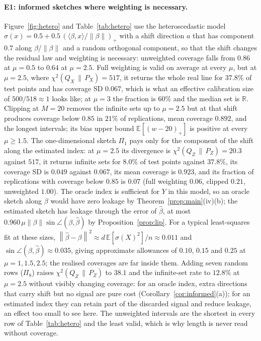 \documentclass[11pt,a4paper]{article}
\newcommand{\PX}{P_X}
\newcommand{\QX}{Q_X}
\newcommand{\chisq}{\chi^2(\QX\,\|\,\PX)}
\newcommand{\chisqZ}{\chi^2(Q_Z\,\|\,P_Z)}
\newcommand{\norm}[1]{\left\|#1\right\|}
\newcommand{\E}{\mathbb{E}}
\newcommand{\R}{\mathbb{R}}
\theoremstyle{plain}
\theoremstyle{definition}
\theoremstyle{remark}
\begin{document}
\paragraph{E1: informed sketches where weighting is necessary.}
Figure~\ref{fig:hetero} and Table~\ref{tab:hetero} use the heteroscedastic model $\sigma(x)=0.5+0.5\,(\langle\beta,x\rangle/\norm\beta)_+$ with a shift direction $a$ that has component $0.7$ along $\beta/\norm\beta$ and a random orthogonal component, so that the shift changes the residual law and weighting is necessary: unweighted coverage falls from $0.86$ at $\mu=0.5$ to $0.64$ at $\mu=2.5$. Full weighting is valid on average at every $\mu$, but at $\mu=2.5$, where $\chisq=517$, it returns the whole real line for $37.8\%$ of test points and has coverage SD $0.067$, which is what an effective calibration size of $500/518\approx1$ looks like; at $\mu=3$ the fraction is $60\%$ and the median set is $\R$. Clipping at $M=20$ removes the infinite sets up to $\mu=2.5$ but at that shift produces coverage below $0.85$ in $21\%$ of replications, mean coverage $0.892$, and the longest intervals; its bias upper bound $\E[(w-20)_+]$ is positive at every $\mu\ge1.5$. The one-dimensional sketch $\Pi_1$ pays only for the component of the shift along the estimated index: at $\mu=2.5$ its divergence is $\chisqZ=20.3$ against $517$, it returns infinite sets for $8.0\%$ of test points against $37.8\%$, its coverage SD is $0.049$ against $0.067$, its mean coverage is $0.923$, and its fraction of replications with coverage below $0.85$ is $0.07$ (full weighting $0.06$, clipped $0.21$, unweighted $1.00$). The oracle index is sufficient for $Y$ in this model, so an oracle sketch along $\beta$ would have zero leakage by Theorem~\ref{prop:main}(iv)(b); the estimated sketch has leakage through the error of $\hat\beta$, at most $0.960\,\mu\norm\beta\sin\angle(\beta,\hat\beta)$ by Proposition~\ref{prop:lip}. For a typical least-squares fit at these sizes, $\norm{\hat\beta-\beta}^2\approx d\,\E[\sigma(X)^2]/n\approx0.011$ and $\sin\angle(\beta,\hat\beta)\approx0.035$, giving approximate allowances of $0.10$, $0.15$ and $0.25$ at $\mu=1,1.5,2.5$; the realised coverages are far inside them. Adding seven random rows ($\Pi_8$) raises $\chisqZ$ to $38.1$ and the infinite-set rate to $12.8\%$ at $\mu=2.5$ without visibly changing coverage: for an oracle index, extra directions that carry shift but no signal are pure cost (Corollary~\ref{cor:informed}(a)); for an estimated index they can retain part of the discarded signal and reduce leakage, an effect too small to see here. The unweighted intervals are the shortest in every row of Table~\ref{tab:hetero} and the least valid, which is why length is never read without coverage.
\end{document}
